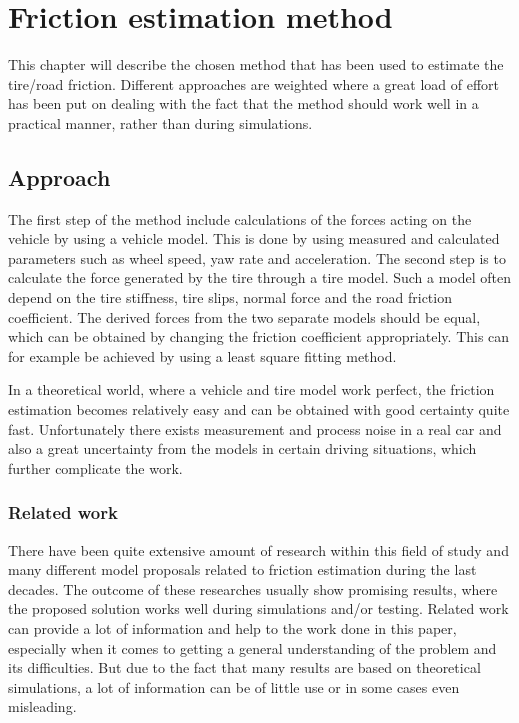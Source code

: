 \chapter{Friction estimation method}

This chapter will describe the chosen method that has been used to estimate the tire/road friction. Different approaches are weighted where a great load of effort has been put on dealing with the fact that the method should work well in a practical manner, rather than during simulations.

\section{Approach}

The first step of the method include calculations of the forces acting on the vehicle by using a vehicle model. This is done by using measured and calculated parameters such as wheel speed, yaw rate and acceleration. The second step is to calculate the force generated by the tire through a tire model. Such a model often depend on the tire stiffness, tire slips, normal force and the road friction coefficient. The derived forces from the two separate models should be equal, which can be obtained by changing the friction coefficient appropriately. This can for example be achieved by using a least square fitting method. 

In a theoretical world, where a vehicle and tire model work perfect, the friction estimation becomes relatively easy and can be obtained with good certainty quite fast. Unfortunately there exists measurement and process noise in a real car and also a great uncertainty from the models in certain driving situations, which further complicate the work.

\subsection{Related work}

There have been quite extensive amount of research within this field of study and many different model proposals related to friction estimation during the last decades. The outcome of these researches usually show promising results, where the proposed solution works well during simulations and/or testing. Related work can provide a lot of information and help to the work done in this paper, especially when it comes to getting a general understanding of the problem and its difficulties. But due to the fact that many results are based on theoretical simulations, a lot of information can be of little use or in some cases even misleading.



